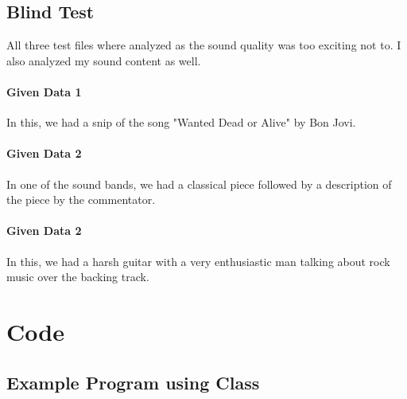 \documentclass{article}
\begin{document}
\subsection{Blind Test}

All three test files where analyzed as the sound quality was too exciting not to. I also analyzed my sound content as well.

\paragraph{Given Data 1} In this, we had a snip of the song "Wanted Dead or Alive" by Bon Jovi.

\paragraph{Given Data 2} In one of the sound bands, we had a classical piece followed by a description of the piece by the commentator.

\paragraph{Given Data 2} In this, we had a harsh guitar with a very enthusiastic man talking about rock music over the backing track.

\section{Code}

\subsection{Example Program using Class}
\end{document}
